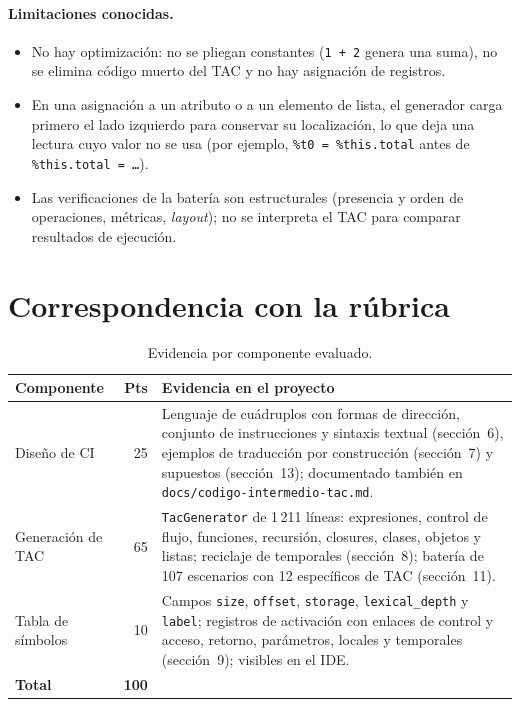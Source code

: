 \documentclass[11pt,a4paper]{article}
\begin{document}
\paragraph{Limitaciones conocidas.}

\begin{itemize}[leftmargin=1.4em]
  \item No hay optimización: no se pliegan constantes (\texttt{1 + 2} genera una
        suma), no se elimina código muerto del TAC y no hay asignación de
        registros.
  \item En una asignación a un atributo o a un elemento de lista, el generador
        carga primero el lado izquierdo para conservar su localización, lo que
        deja una lectura cuyo valor no se usa (por ejemplo,
        \texttt{\%t0 = \%this.total} antes de \texttt{\%this.total = \dots}).
  \item Las verificaciones de la batería son estructurales (presencia y orden de
        operaciones, métricas, \emph{layout}); no se interpreta el TAC para
        comparar resultados de ejecución.
\end{itemize}

\section{Correspondencia con la rúbrica}

\begin{table}[H]
\centering
\small
\begin{tabular}{@{}L{3.6cm}rL{9.4cm}@{}}
\toprule
\textbf{Componente} & \textbf{Pts} & \textbf{Evidencia en el proyecto} \\
\midrule
Diseño de CI & 25 &
Lenguaje de cuádruplos con formas de dirección, conjunto de instrucciones y
sintaxis textual (sección~6), ejemplos de traducción por construcción
(sección~7) y supuestos (sección~13); documentado también en
\texttt{docs/codigo-intermedio-tac.md}. \\
Generación de TAC & 65 &
\texttt{TacGenerator} de 1\,211 líneas: expresiones, control de flujo,
funciones, recursión, closures, clases, objetos y listas; reciclaje de
temporales (sección~8); batería de 107 escenarios con 12 específicos de TAC
(sección~11). \\
Tabla de símbolos & 10 &
Campos \texttt{size}, \texttt{offset}, \texttt{storage},
\texttt{lexical\_depth} y \texttt{label}; registros de activación con enlaces de
control y acceso, retorno, parámetros, locales y temporales (sección~9);
visibles en el IDE. \\
\midrule
\textbf{Total} & \textbf{100} & \\
\bottomrule
\end{tabular}
\caption{Evidencia por componente evaluado.}
\end{table}
\end{document}
